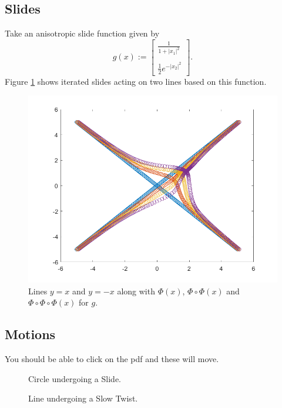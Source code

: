 \documentclass{amsart}
\theoremstyle{remark}
\theoremstyle{definition}
\begin{document}
\subsection{Slides}

Take an anisotropic slide function given by
\[ g(x) := \begin{bmatrix}\frac{1}{1+|x_1|^2}\\ \\ \frac12 e^{-|x_2|^2} \end{bmatrix}. \]  Figure \ref{FIG:Slide} shows iterated slides acting on two lines based on this function.

\begin{figure}[h!]
    \centering
    \includegraphics[scale=0.35]{Slide.png}
    \caption{Lines $y=x$ and $y=-x$ along with $\Phi(x)$, $\Phi\circ\Phi(x)$ and $\Phi\circ\Phi\circ\Phi(x)$ for $g$.}
    \label{FIG:Slide}
\end{figure}

\subsection{Motions}

You should be able to click on the pdf and these will move.

\begin{figure}[h!]
    \centering
    \caption{Circle undergoing a Slide.}
\end{figure}

\begin{figure}[h!]
    \centering
    \caption{Line undergoing a Slow Twist.}
\end{figure}
\end{document}
